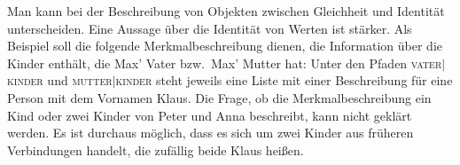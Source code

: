 Man kann bei der Beschreibung von Objekten zwischen Gleichheit und Identität
unterscheiden. Eine Aussage über die Identität von Werten ist stärker. Als
Beispiel soll die folgende Merkmalbeschreibung dienen, die Information
über die Kinder enthält, die Max' Vater bzw.\ Max' Mutter hat:
\ea
{}
\z
Unter den Pfaden \textsc{vater$|$kinder} und \textsc{mutter$|$kinder} steht jeweils
eine Liste mit einer Beschreibung für eine Person mit dem Vornamen Klaus.
Die Frage, ob die Merkmalbeschreibung ein Kind oder zwei Kinder von Peter und Anna
beschreibt, kann nicht geklärt werden. Es ist durchaus möglich,
dass es sich um zwei Kinder aus früheren Verbindungen handelt, die zufällig
beide Klaus heißen.
\largerpage

